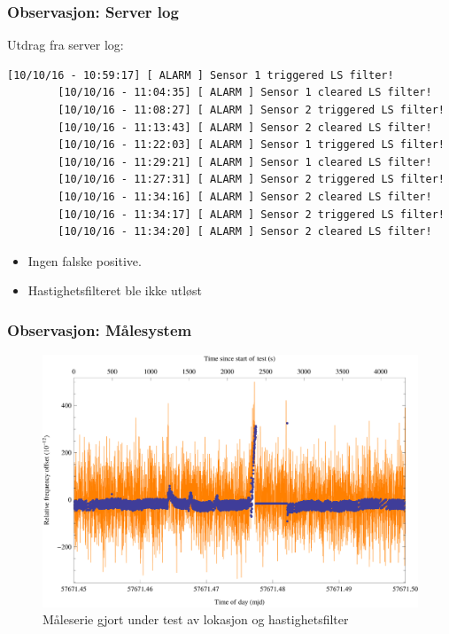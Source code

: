 \documentclass[xcolor=table]{beamer}
\begin{document}
\begin{frame}[fragile]
\frametitle{Observasjon: Server log}
Utdrag fra server log:
      \begin{lstlisting}[basicstyle=\ttfamily\tiny]
        [10/10/16 - 10:59:17] [ ALARM ] Sensor 1 triggered LS filter!
        [10/10/16 - 11:04:35] [ ALARM ] Sensor 1 cleared LS filter!
        [10/10/16 - 11:08:27] [ ALARM ] Sensor 2 triggered LS filter!
        [10/10/16 - 11:13:43] [ ALARM ] Sensor 2 cleared LS filter!
        [10/10/16 - 11:22:03] [ ALARM ] Sensor 1 triggered LS filter!
        [10/10/16 - 11:29:21] [ ALARM ] Sensor 1 cleared LS filter!
        [10/10/16 - 11:27:31] [ ALARM ] Sensor 2 triggered LS filter!
        [10/10/16 - 11:34:16] [ ALARM ] Sensor 2 cleared LS filter!
        [10/10/16 - 11:34:17] [ ALARM ] Sensor 2 triggered LS filter!
        [10/10/16 - 11:34:20] [ ALARM ] Sensor 2 cleared LS filter!
      \end{lstlisting} 
\begin{itemize}
  \item Ingen falske positive.
  \item Hastighetsfilteret ble ikke utløst
\end{itemize}
\end{frame}

\begin{frame}
\frametitle{Observasjon: Målesystem}
      \begin{figure}
        \includegraphics[scale=0.70]{thesis/graphics/cns91-and-csac-telemetry-frequency-1.png}
        \caption{Måleserie gjort under test av lokasjon og hastighetsfilter}
      \end{figure}
\end{frame}
\end{document}
